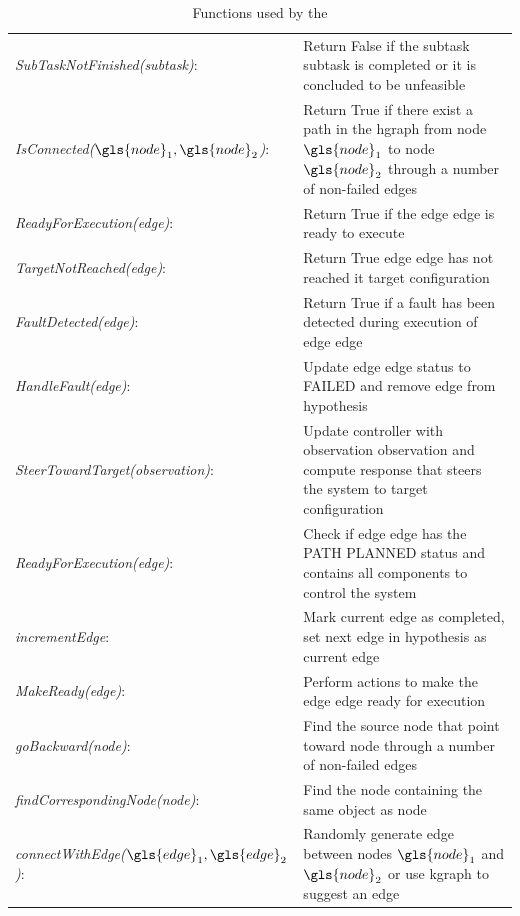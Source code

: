 \noindent
\begin{table}[H]
\centering
\begin{tabular}%
  {>{\raggedright\arraybackslash}p{}%
   >{\raggedright\arraybackslash}p{}}
\textit{SubTaskNotFinished(\gls{subtask})}:& Return False if the subtask \gls{subtask} is completed or it is concluded to be unfeasible \\
\textit{IsConnected($\gls{node}_1, \gls{node}_2$)}:& Return True if there exist a path in the \ac{hgraph} from node $\gls{node}_1$  to node $\gls{node}_2$ through a number of non-failed edges\\
\textit{ReadyForExecution(\gls{edge})}: & Return True if the edge \gls{edge} is ready to execute\\
\textit{TargetNotReached(\gls{edge})}: & Return True edge \gls{edge} has not reached it target configuration\\
\textit{FaultDetected(\gls{edge})}: & Return True if a fault has been detected during execution of edge \gls{edge}\\

\textit{HandleFault(\gls{edge})}: & Update edge \gls{edge} status to FAILED and remove edge from hypothesis \\
\textit{SteerTowardTarget(\gls{observation})}: & Update controller with observation \gls{observation} and compute response that steers the system to target configuration\\
\textit{ReadyForExecution(\gls{edge})}: & Check if edge \gls{edge} has the PATH PLANNED status and contains all components to control the system \\
\textit{incrementEdge}: & Mark current edge as completed, set next edge in \gls{hypothesis} as current edge \\
\textit{MakeReady(\gls{edge})}: & Perform actions to make the edge \gls{edge} ready for execution \\
\textit{goBackward(\gls{node})}: & Find the source node that point toward \gls{node} through a number of non-failed edges\\
\textit{findCorrespondingNode(\gls{node})}: & Find the node containing the same object as \gls{node} \\
\textit{connectWithEdge($\gls{edge}_1, \gls{edge}_2$)}: & Randomly generate edge between nodes $\gls{node}_1$ and $\gls{node}_2$ or use \ac{kgraph} to suggest an edge\\
\end{tabular}
\caption{Functions used by the }
\label{table:functions_for_halgorithm}
\end{table}

